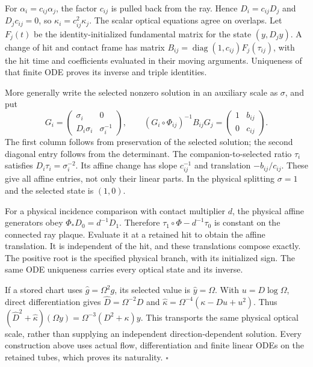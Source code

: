 \documentclass[
  english,
  11pt,
  reqno]{amsart}
\begin{document}
For \(\alpha_i=c_{ij}\alpha_j\), the factor \(c_{ij}\) is pulled back
from the ray. Hence \(D_i=c_{ij}D_j\) and \(D_jc_{ij}=0\), so
\(\kappa_i=c_{ij}^2\kappa_j\). The scalar optical equations agree on
overlaps. Let \(F_j(t)\) be the identity-initialized fundamental matrix
for the state \((y,D_jy)\). A change of hit and contact frame has matrix
\(B_{ij}=\operatorname{diag}(1,c_{ij})F_j(\tau_{ij})\), with the hit
time and coefficients evaluated in their moving arguments. Uniqueness of
that finite ODE proves its inverse and triple identities.

More generally write the selected nonzero solution in an auxiliary scale
as \(\sigma\), and put%
 \[
G_i=\begin{pmatrix}\sigma_i&0\\D_i\sigma_i&\sigma_i^{-1}\end{pmatrix},
\qquad
(G_i\circ\Phi_{ij})^{-1}B_{ij}G_j
=\begin{pmatrix}1&b_{ij}\\0&c_{ij}\end{pmatrix}.
\] The first column follows from preservation of the selected solution;
the second diagonal entry follows from the determinant. The
companion-to-selected ratio \(\tau_i\) satisfies
\(D_i\tau_i=\sigma_i^{-2}\). Its affine change has slope \(c_{ij}^{-1}\)
and translation \(-b_{ij}/c_{ij}\). These give all affine entries, not
only their linear parts. In the physical splitting \(\sigma=1\) and the
selected state is \((1,0)\).

For a physical incidence comparison with contact multiplier \(d\), the
physical affine generators obey \(\Phi_*D_0=d^{-1}D_1\). Therefore
\(\tau_1\circ\Phi-d^{-1}\tau_0\) is constant on the connected ray
plaque. Evaluate it at a retained hit to obtain the affine translation.
It is independent of the hit, and these translations compose exactly.
The positive root is the specified physical branch, with its initialized
sign. The same ODE uniqueness carries every optical state and its
inverse.

If a stored chart uses \(\widehat g=\Omega^2g\), its selected value is
\(\widehat y=\Omega\). With \(u=D\log\Omega\), direct differentiation
gives \(\widehat D=\Omega^{-2}D\) and
\(\widehat\kappa=\Omega^{-4}(\kappa-Du+u^2)\). Thus
\((\widehat D^2+\widehat\kappa)(\Omega y)=\Omega^{-3}(D^2+\kappa)y\).
This transports the same physical optical scale, rather than supplying
an independent direction-dependent solution. Every construction above
uses actual flow, differentiation and finite linear ODEs on the retained
tubes, which proves its naturality. \hfill\(\square\)
\end{document}
